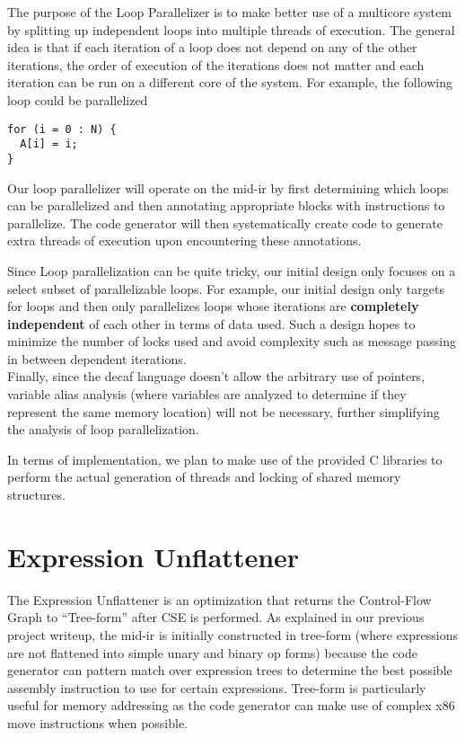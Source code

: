 \documentclass[11pt]{article}
\begin{document}
The purpose of the Loop Parallelizer is to make better use of a multicore
system by splitting up independent loops into multiple threads of
execution. The general idea is that if each iteration of a loop does
not depend on any of the other iterations, the order of execution of
the iterations does not matter and each iteration can be run on a
different core of the system. For example, the following loop could be
parallelized 

\begin{verbatim}
for (i = 0 : N) {
  A[i] = i; 
}
\end{verbatim} 

Our loop parallelizer will operate on the mid-ir by first determining
which loops can be parallelized and then annotating appropriate blocks
with instructions to parallelize. The code generator will then
systematically create code to generate extra threads of execution upon encountering
these annotations.

Since Loop parallelization can be quite tricky, our initial design
only focuses on a select subset of parallelizable loops. For example,
our initial design only targets for loops and then only parallelizes
loops whose iterations are \textbf{completely independent} of each
other in terms of data used. Such a design hopes to minimize the
number of locks used and avoid complexity such as message passing in
between dependent iterations.\\

Finally, since the decaf language doesn't allow the arbitrary use of
pointers, variable alias analysis (where variables are analyzed to
determine if they represent the same memory location) will not be
necessary, further simplifying the analysis of loop parallelization. 

In terms of implementation, we plan to make use of the provided C
libraries to perform the actual generation of threads and locking of
shared memory structures.  

\section {Expression Unflattener}
\label{sec:unflatten}

The Expression Unflattener is an optimization that returns the
Control-Flow Graph to ``Tree-form'' after CSE is performed. As
explained in our previous project writeup, the mid-ir is initially constructed
in tree-form (where expressions are not flattened into simple unary
and binary op forms) because the code generator can pattern match over
expression trees to determine the best possible assembly
instruction to use for certain expressions. Tree-form is particularly
useful for memory addressing as the code generator can make use of
complex x86 move instructions when possible.\\
\end{document}
